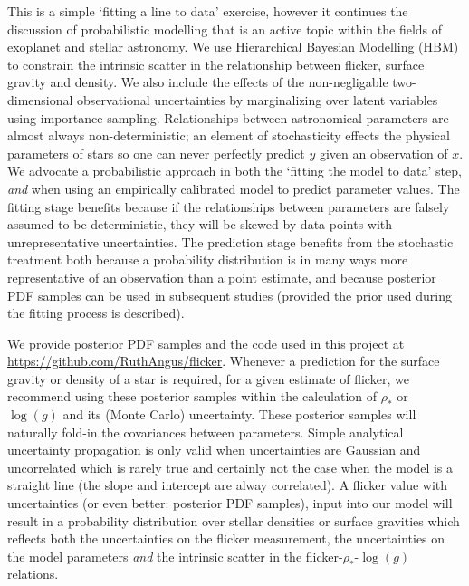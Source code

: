 \documentclass[apjl]{emulateapj}
\begin{document}
This is a simple `fitting a line to data' exercise, however it continues the
discussion of probabilistic modelling that is an active topic within the
fields of exoplanet and stellar astronomy.
We use Hierarchical Bayesian Modelling (HBM) to constrain the intrinsic
scatter in the relationship between flicker, surface gravity and density.
We also include the effects of the non-negligable two-dimensional observational
uncertainties by marginalizing over latent variables using importance sampling.
Relationships between astronomical parameters are almost always
non-deterministic; an element of stochasticity effects the physical parameters
of stars so one can never perfectly predict $y$ given an observation of $x$.
We advocate a probabilistic approach in both the `fitting the model to data'
step, {\it and} when using an empirically calibrated model to predict
parameter values.
The fitting stage benefits because if the relationships between parameters are
falsely assumed to be deterministic, they will be skewed by data points with
unrepresentative uncertainties.
The prediction stage benefits from the stochastic treatment both because a
probability distribution is in many ways more representative of an observation
than a point estimate, and because posterior PDF samples can be used in
subsequent studies (provided the prior used during the fitting process is
described).

We provide posterior PDF samples and the code used in this project at
\url{https://github.com/RuthAngus/flicker}.
Whenever a prediction for the surface gravity or density of a star is required,
for a given estimate of flicker, we recommend using these posterior samples
within the calculation of $\rho_{*}$ or $\log(g)$ and its (Monte Carlo)
uncertainty.
These posterior samples will naturally fold-in the covariances between
parameters.
Simple analytical uncertainty propagation is only valid when uncertainties are
Gaussian and uncorrelated which is rarely true and certainly not the case when
the model is a straight line (the slope and intercept are alway correlated).
A flicker value with uncertainties (or even better: posterior PDF
samples), input into our model will result in a probability distribution over
stellar densities or surface gravities which reflects both the uncertainties
on the flicker measurement, the uncertainties on the model parameters {\it and}
the intrinsic scatter in the flicker-$\rho_{*}$-$\log(g)$ relations.
\end{document}
